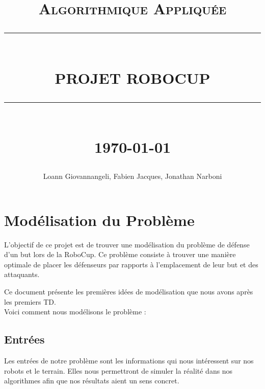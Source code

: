 \documentclass[12pt]{report}
\newcommand{\HRule}[1]{\rule{\linewidth}{#1}}
\begin{document}
\title{ \normalsize \textsc{Algorithmique Appliquée}
		\\ [2.0cm]
		\HRule{0.5pt} \\
		\LARGE \textbf{\uppercase{Projet RoboCup}}
		\HRule{2pt} \\ [0.5cm]
		\normalsize \today \vspace*{5\baselineskip}}

\date{}

\author{
		Loann Giovannangeli, Fabien Jacques, Jonathan Narboni}

\maketitle
\renewcommand{\contentsname}{Sommaire}
\tableofcontents
\newpage

\sectionfont{\scshape}


\part*{Modélisation du Problème}

L'objectif de ce projet est de trouver une modélisation du problème de défense d'un but lors de la RoboCup. Ce problème consiste à trouver une manière optimale de placer les défenseurs par rapports à l'emplacement de leur but et des attaquants.

Ce document présente les premières idées de modélisation que nous avons après les premiers TD.\\

Voici comment nous modélisons le problème :
\newline
\newline
\chapter{Entrées}
Les entrées de notre problème sont les informations qui nous intéressent sur nos robots et le terrain. Elles nous permettront de simuler la réalité dans nos algorithmes afin que nos résultats aient un sens concret.\\
\end{document}
